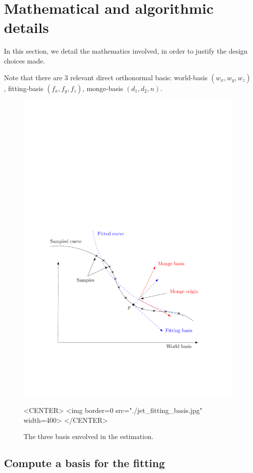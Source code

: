 
\section{Mathematical and algorithmic details}

In this section, we detail the mathematics involved, in order to
justify the design choices made.

Note that there are 3 relevant direct orthonormal basis: world-basis
$(w_x,w_y,w_z)$, fitting-basis $(f_x,f_y,f_z)$, monge-basis
$(d_1,d_2,n)$.

\begin{figure}[h!]
\begin{ccTexOnly}
\centerline{
\includegraphics[width=.5\linewidth]{Jet_fitting_3/jet_fitting_basis}}
\end{ccTexOnly}

\label{fig:jet_fitting_basis}
\caption{The three basis envolved in the estimation.}

\begin{ccHtmlOnly}
<CENTER>
<img border=0 src="./jet_fitting_basis.jpg" width=400>
</CENTER>
\end{ccHtmlOnly}
\end{figure}

\subsection{Compute a basis for the fitting}

